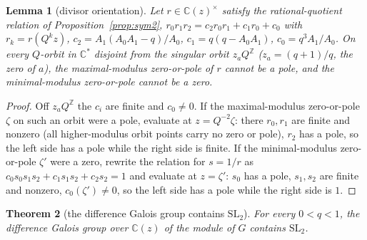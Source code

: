 \documentclass[11pt]{article}
\theoremstyle{plain}
\newtheorem{theorem}{Theorem}
\newtheorem{lemma}[theorem]{Lemma}
\theoremstyle{definition}
\theoremstyle{remark}
\newcommand{\Z}{\mathbb{Z}}
\newcommand{\C}{\mathbb{C}}
\begin{document}
\begin{lemma}[divisor orientation]
\label{lem:divisor}
Let $r\in\C(z)^\times$ satisfy the rational-quotient relation of Proposition~\ref{prop:sym2},
$r_0r_1r_2=c_2r_0r_1+c_1r_0+c_0$ with $r_k=r(Q^kz)$, $c_2=A_1(A_0A_1-q)/A_0$, $c_1=q(q-A_0A_1)$,
$c_0=q^3A_1/A_0$. On every $Q$-orbit in $\C^*$ disjoint from the singular orbit $z_aQ^{\Z}$
($z_a=(q+1)/q$, the zero of $a$), the maximal-modulus zero-or-pole of $r$ cannot be a pole, and the
minimal-modulus zero-or-pole cannot be a zero.
\end{lemma}

\begin{proof}
Off $z_aQ^{\Z}$ the $c_i$ are finite and $c_0\ne0$. If the maximal-modulus zero-or-pole $\zeta$ on
such an orbit were a pole, evaluate at $z=Q^{-2}\zeta$: there $r_0,r_1$ are finite and nonzero (all
higher-modulus orbit points carry no zero or pole), $r_2$ has a pole, so the left side has a pole
while the right side is finite. If the minimal-modulus zero-or-pole $\zeta'$ were a zero, rewrite
the relation for $s=1/r$ as $c_0s_0s_1s_2+c_1s_1s_2+c_2s_2=1$ and evaluate at $z=\zeta'$: $s_0$ has
a pole, $s_1,s_2$ are finite and nonzero, $c_0(\zeta')\ne0$, so the left side has a pole while the
right side is $1$.
\end{proof}

\begin{theorem}[the difference Galois group contains $\mathrm{SL}_2$]
\label{thm:sl2}
For every $0<q<1$, the difference Galois group over $\C(z)$ of the module of $G$ contains
$\mathrm{SL}_2$.
\end{theorem}
\end{document}
